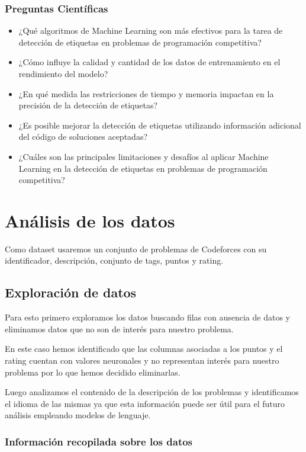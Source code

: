 \documentclass{article}
\begin{document}
\subsubsection{Preguntas Científicas}

\begin{itemize}
    \item ¿Qué algoritmos de Machine Learning son más efectivos para la tarea de detección de etiquetas en problemas de programación competitiva?
    \item ¿Cómo influye la calidad y cantidad de los datos de entrenamiento en el rendimiento del modelo?
    \item ¿En qué medida las restricciones de tiempo y memoria impactan en la precisión de la detección de etiquetas?
    \item ¿Es posible mejorar la detección de etiquetas utilizando información adicional del código de soluciones aceptadas?
    \item ¿Cuáles son las principales limitaciones y desafíos al aplicar Machine Learning en la detección de etiquetas en problemas de programación competitiva?
\end{itemize}

\section{Análisis de los datos}

Como dataset usaremos un conjunto de problemas de Codeforces con su identificador, descripción, conjunto de tags, puntos y rating. 

\subsection{Exploración de datos}

Para esto primero exploramos los datos buscando filas con ausencia de datos y eliminamos datos que no son de interés para
nuestro problema. 

En este caso hemos identificado que las columnas asociadas a los puntos y el rating cuentan con valores neuronales
y no representan interés para nuestro problema por lo que hemos decidido eliminarlas.

Luego analizamos el contenido de la descripción de los problemas y identificamos el idioma de las mismas ya que esta
información puede ser útil para el futuro análisis empleando modelos de lenguaje.

\subsubsection{Información recopilada sobre los datos}
\end{document}
